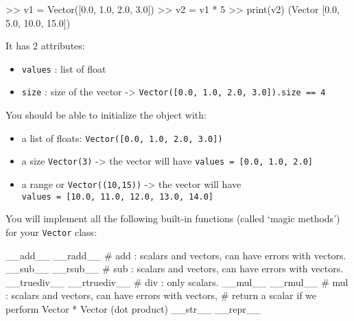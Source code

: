 \documentclass[]{article}
\newenvironment{Shaded}{\begin{snugshade}}{\end{snugshade}}
\newcommand{\BuiltInTok}[1]{\textcolor[rgb]{0.50,0.55,0.55}{#1}}
\newcommand{\CommentTok}[1]{\textcolor[rgb]{0.48,0.49,0.49}{#1}}
\newcommand{\DecValTok}[1]{\textcolor[rgb]{0.96,0.45,0.00}{#1}}
\newcommand{\FloatTok}[1]{\textcolor[rgb]{0.96,0.45,0.00}{#1}}
\newcommand{\FunctionTok}[1]{\textcolor[rgb]{0.56,0.27,0.68}{#1}}
\newcommand{\NormalTok}[1]{\textcolor[rgb]{0.81,0.81,0.76}{#1}}
\newcommand{\OperatorTok}[1]{\textcolor[rgb]{0.81,0.81,0.76}{#1}}
\begin{document}
\begin{Shaded}
\begin{Highlighting}[]
\OperatorTok{>>}\NormalTok{ v1 }\OperatorTok{=}\NormalTok{ Vector([}\FloatTok{0.0}\NormalTok{, }\FloatTok{1.0}\NormalTok{, }\FloatTok{2.0}\NormalTok{, }\FloatTok{3.0}\NormalTok{])}
\OperatorTok{>>}\NormalTok{ v2 }\OperatorTok{=}\NormalTok{ v1 }\OperatorTok{*} \DecValTok{5}
\OperatorTok{>>} \BuiltInTok{print}\NormalTok{(v2)}
\NormalTok{(Vector [}\FloatTok{0.0}\NormalTok{, }\FloatTok{5.0}\NormalTok{, }\FloatTok{10.0}\NormalTok{, }\FloatTok{15.0}\NormalTok{])}
\end{Highlighting}
\end{Shaded}

It has 2 attributes:

\begin{itemize}
\item
  \texttt{values} : list of float
\item
  \texttt{size} : size of the vector -\textgreater{}
  \texttt{Vector({[}0.0,\ 1.0,\ 2.0,\ 3.0{]}).size\ ==\ 4}
\end{itemize}

You should be able to initialize the object with:

\begin{itemize}
\item
  a list of floats: \texttt{Vector({[}0.0,\ 1.0,\ 2.0,\ 3.0{]})}
\item
  a size \texttt{Vector(3)} -\textgreater{} the vector will have
  \texttt{values\ =\ {[}0.0,\ 1.0,\ 2.0{]}}
\item
  a range or \texttt{Vector((10,15))} -\textgreater{} the vector will
  have \texttt{values\ =\ {[}10.0,\ 11.0,\ 12.0,\ 13.0,\ 14.0{]}}
\end{itemize}

You will implement all the following built-in functions (called `magic
methods') for your \texttt{Vector} class:

\begin{Shaded}
\begin{Highlighting}[]
    \FunctionTok{__add__}
    \FunctionTok{__radd__}
    \CommentTok{# add : scalars and vectors, can have errors with vectors.}
    \FunctionTok{__sub__}
    \FunctionTok{__rsub__}
    \CommentTok{# sub : scalars and vectors, can have errors with vectors.}
    \FunctionTok{__truediv__}
    \FunctionTok{__rtruediv__}
    \CommentTok{# div : only scalars.}
    \FunctionTok{__mul__}
    \FunctionTok{__rmul__}
    \CommentTok{# mul : scalars and vectors, can have errors with vectors, }
    \CommentTok{# return a scalar if we perform Vector * Vector (dot product)}
    \FunctionTok{__str__}
    \FunctionTok{__repr__}
\end{Highlighting}
\end{Shaded}
\end{document}
